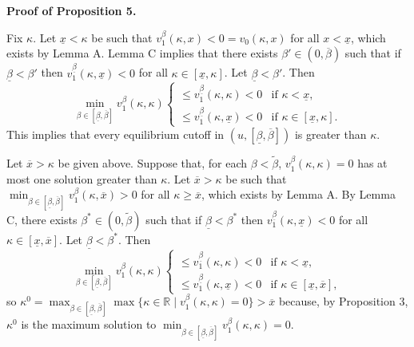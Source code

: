 \documentclass[12pt,a4paper]{article}
\newenvironment{original}
  {\par\medskip\noindent\color{black}\ignorespaces}
  {\par\medskip}
\theoremstyle{definition}
\theoremstyle{remark}
\begin{document}
\medskip
\noindent\textbf{Proof of Proposition 5.}
\begin{original}
Fix $\kappa$. Let $\underline{x} < \kappa$ be such that $v_1^\beta(\kappa, x) < 0 = v_0(\kappa, x)$ for all $x < \underline{x}$, which exists by Lemma A. Lemma C implies that there exists $\beta' \in (0, \overline{\beta})$ such that if $\underline{\beta} < \beta'$ then $v_1^{\underline{\beta}}(\kappa, \underline{x}) < 0$ for all $\kappa \in [\underline{x}, \kappa]$. Let $\underline{\beta} < \beta'$. Then
\[
\min_{\beta \in [\underline{\beta}, \overline{\beta}]} v_1^\beta(\kappa, \kappa)
\begin{cases}
\le v_1^{\underline{\beta}}(\kappa, \kappa) < 0 & \text{if } \kappa < \underline{x},\\
\le v_1^{\underline{\beta}}(\kappa, \underline{x}) < 0 & \text{if } \kappa \in [\underline{x}, \kappa].
\end{cases}
\]
This implies that every equilibrium cutoff in $(u, [\underline{\beta}, \overline{\beta}])$ is greater than $\kappa$.

Let $\overline{x} > \kappa$ be given above. Suppose that, for each $\beta < \tilde{\beta}$, $v_1^\beta(\kappa, \kappa) = 0$ has at most one solution greater than $\kappa$. Let $\overline{x} > \kappa$ be such that $\min_{\beta \in [\underline{\beta}, \overline{\beta}]} v_1^\beta(\kappa, \overline{x}) > 0$ for all $\kappa \ge \overline{x}$, which exists by Lemma A. By Lemma C, there exists $\beta^* \in (0, \tilde{\beta})$ such that if $\underline{\beta} < \beta^*$ then $v_1^{\underline{\beta}}(\kappa, \underline{x}) < 0$ for all $\kappa \in [\underline{x}, \overline{x}]$. Let $\underline{\beta} < \beta^*$. Then
\[
\min_{\beta \in [\underline{\beta}, \overline{\beta}]} v_1^\beta(\kappa, \kappa)
\begin{cases}
\le v_1^{\underline{\beta}}(\kappa, \kappa) < 0 & \text{if } \kappa < \underline{x},\\
\le v_1^{\underline{\beta}}(\kappa, \underline{x}) < 0 & \text{if } \kappa \in [\underline{x}, \overline{x}],
\end{cases}
\tag{D.2}
\]
so $\kappa^0 = \max_{\beta \in [\underline{\beta}, \overline{\beta}]} \max\{\kappa \in \mathbb{R} \mid v_1^\beta(\kappa, \kappa) = 0\} > \overline{x}$ because, by Proposition 3, $\kappa^0$ is the maximum solution to $\min_{\beta \in [\underline{\beta}, \overline{\beta}]} v_1^\beta(\kappa, \kappa) = 0$.


\end{original}
\end{document}
